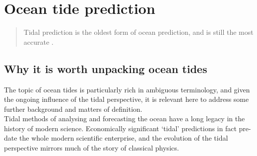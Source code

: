 \section{Ocean tide prediction}
\label{S:TIDE}

\begin{quote}
Tidal prediction is the oldest form of ocean prediction, and is still the most accurate \citep{Parker:2007wq}. 
\end{quote}

\subsection{Why it is worth unpacking ocean tides}
\label{SS:semantics}

The topic of ocean tides is particularly rich in ambiguous terminology, and given the ongoing influence of the tidal perspective, it is relevant here to address some further background and matters of definition.\\ 
Tidal methods of analysing and forecasting the ocean have a long legacy in the history of modern science.  Economically significant `tidal' predictions in fact pre-date the whole modern scientific enterprise, and the evolution of the tidal perspective mirrors much of the story of classical physics.\\

